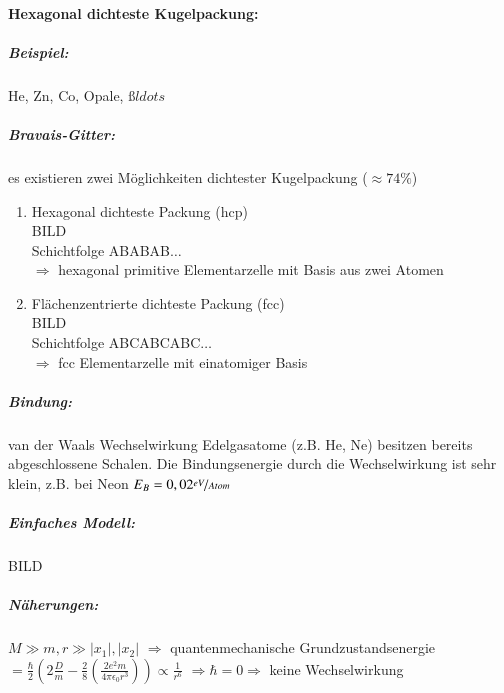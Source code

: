 \documentclass[paper=A4,12pt,pagesize,twoside,BCOR=8mm,ngerman]{scrartcl}
\newcommand{\abs}[1]{\left| #1 \right|} %
\begin{document}
			\paragraph*{Hexagonal dichteste Kugelpackung:}
				\subparagraph*{Beispiel:} He, Zn, Co, Opale, $ßldots$
				\subparagraph*{Bravais-Gitter:} es existieren zwei 
				Möglichkeiten dichtester Kugelpackung ($\approx 74\%$)
				\begin{enumerate}
					\item	Hexagonal dichteste Packung (hcp)\\
							BILD\\
							Schichtfolge ABABAB$\ldots${}\\ 
							$\Rightarrow${}
							hexagonal primitive Elementarzelle mit Basis
							aus zwei Atomen
					\item	Flächenzentrierte dichteste Packung (fcc)\\
							BILD\\
							Schichtfolge ABCABCABC$\ldots${}\\ 
							$\Rightarrow${}
							fcc Elementarzelle mit einatomiger Basis
				\end{enumerate}

				\subparagraph*{Bindung:} van der Waals Wechselwirkung
				Edelgasatome (z.B. He, Ne) besitzen bereits 
				abgeschlossene Schalen. Die
				Bindungsenergie durch die Wechselwirkung ist sehr 
				klein, z.B. bei Neon $E_{B}=0,02\nicefrac{eV}{Atom}$\\
				\subparagraph*{Einfaches Modell:}
				BILD\\
				\subparagraph*{Näherungen:} $M \gg m , r \gg 
				\abs{x_{1}}, \abs{x_{2}}$ $\Rightarrow$ 
				quantenmechanische Grundzustandsenergie $=
				\frac{\hbar}{2} \left( 2 \frac{D}{m} - \frac{2}{8} 
				\left( \frac{2e^{2}m}{4\pi\epsilon_{0}r^{3}} \right) 
				\right) \propto \frac{1}{r^{6}}$ $\Rightarrow \hbar = 0 
				\Rightarrow$ keine Wechselwirkung
\end{document}

